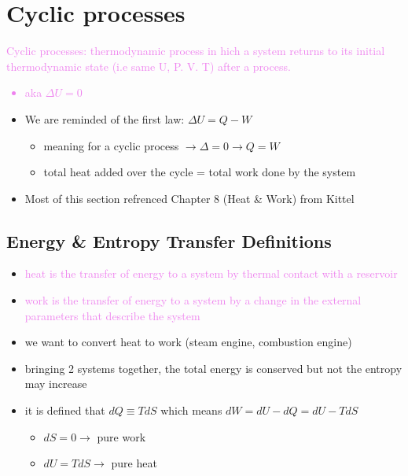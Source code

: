
\section{Cyclic processes}


\textcolor{violet}{Cyclic processes: thermodynamic process in hich a system returns to its initial 
thermodynamic state (i.e same U, P. V. T) after a process.
    \begin{itemize}
        \item aka $\Delta U = 0$
    \end{itemize}
}

\begin{itemize}
    \item We are reminded of the first law: $\Delta U = Q - W$
    \begin{itemize}
        \item meaning for a cyclic process  $\rightarrow \Delta = 0 \rightarrow Q = W$
        \item total heat added over the cycle = total work done by the system 
    \end{itemize}
    \item Most of this section refrenced Chapter 8 (Heat \& Work) from Kittel 
\end{itemize}


\subsection*{Energy \& Entropy Transfer Definitions}
\begin{itemize}
    \item \textcolor{violet}{heat is the transfer of energy to a system by thermal contact 
    with a reservoir }
    \item \textcolor{violet}{work is the transfer of energy to a system by a change in the 
    external parameters that describe the system }
    \item we want to convert heat to work (steam engine, combustion engine)
    \item bringing 2 systems together, the total energy is conserved but not the entropy 
    may increase
    \item it is defined that $dQ \equiv T dS$ which means $dW = dU - dQ = dU - TdS$
    \begin{itemize}
        \item $dS = 0 \rightarrow$ pure work 
        \item $dU = TdS \rightarrow$ pure heat
    \end{itemize}
\end{itemize}

